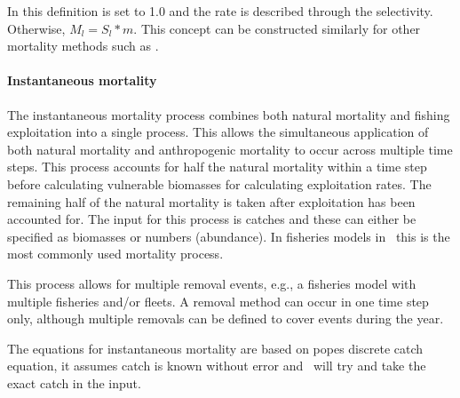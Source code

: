 In this definition  is set to 1.0 and the rate is described through the selectivity. Otherwise, $M_{l} = S_{l} * m$. This concept can be constructed similarly for other mortality methods such as .

\paragraph{Instantaneous mortality}\label{sec:Process-Length-MortalityInstantaneous}

The instantaneous mortality process combines both natural mortality and fishing exploitation into a single process. This allows the simultaneous application of both natural mortality and anthropogenic mortality to occur across multiple time steps. This process accounts for half the natural mortality within a time step before calculating vulnerable biomasses for calculating exploitation rates. The remaining half of the natural mortality is taken after exploitation has been accounted for. The input for this process is catches and these can either be specified as biomasses or numbers (abundance). In fisheries models in \CNAME\ this is the most commonly used mortality process.

This process allows for multiple removal events, e.g., a fisheries model with multiple fisheries and/or fleets. A removal method can occur in one time step only, although multiple removals can be defined to cover events during the year.

The equations for instantaneous mortality are based on popes discrete catch equation, it assumes catch is known without error and \CNAME\ will try and take the exact catch in the input.



